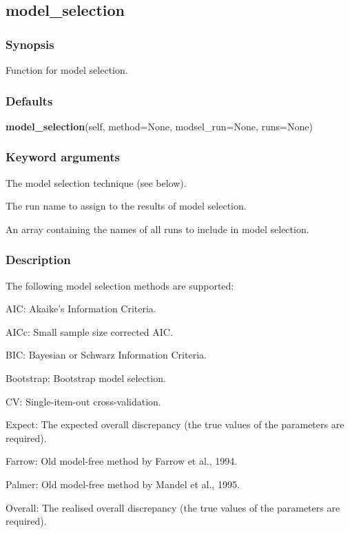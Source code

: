 \subsection{model\_selection}


\subsubsection{Synopsis}

Function for model selection.

\subsubsection{Defaults}

\textsf{\textbf{model\_selection}(self, method=None, modsel\_run=None, runs=None)}


\subsubsection{Keyword arguments}


  The model selection technique (see below).

  The run name to assign to the results of model selection.

  An array containing the names of all runs to include in model selection.

\subsubsection{Description}

The following model selection methods are supported:

AIC:  Akaike's Information Criteria.

AICc:  Small sample size corrected AIC.

BIC:  Bayesian or Schwarz Information Criteria.

Bootstrap:  Bootstrap model selection.

CV:  Single-item-out cross-validation.

Expect:  The expected overall discrepancy (the true values of the parameters are required).

Farrow:  Old model-free method by Farrow et al., 1994.

Palmer:  Old model-free method by Mandel et al., 1995.

Overall:  The realised overall discrepancy (the true values of the parameters are required).

